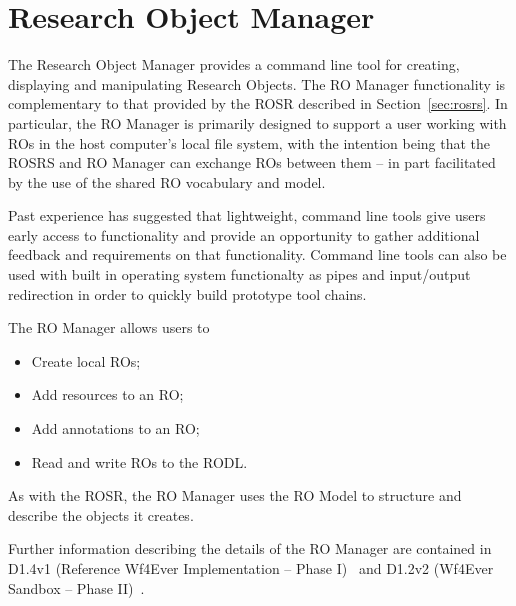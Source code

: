 \section{Research Object Manager}
\label{sec:manager}

The Research Object Manager provides a command line tool for creating, displaying and manipulating Research Objects. The RO Manager functionality is complementary to that provided by the ROSR described in Section~\ref{sec:rosrs}. In particular, the RO Manager is primarily designed to support a user working with ROs in the host computer's local file system, with the intention being that the ROSRS and RO Manager can exchange ROs between them -- in part facilitated by the use of the shared RO vocabulary and model.

Past experience has suggested that lightweight, command line tools give users early access to functionality and provide an opportunity to gather additional feedback and requirements on that functionality. Command line tools can also be used with built in operating system functionalty as pipes and input/output redirection in order to quickly build prototype tool chains.

The RO Manager allows users to 
\begin{itemize}
\item Create local ROs;
\item Add resources to an RO;
\item Add annotations to an RO;
\item Read and write ROs to the RODL.
\end{itemize}

As with the ROSR, the RO Manager uses the RO Model to structure and describe the objects it creates.

Further information describing the details of the RO Manager are contained in D1.4v1 (Reference Wf4Ever Implementation -- Phase I)~\cite{D1.4v1} and D1.2v2 (Wf4Ever Sandbox – Phase II)~\cite{D1.2v2}.
